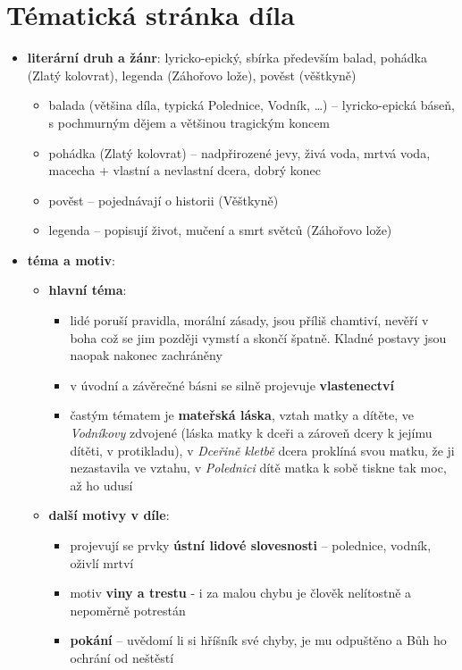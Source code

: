 \documentclass[10pt,a4paper]{article}
\begin{document}
\section*{Tématická stránka díla}
\begin{itemize}
\item \textbf{literární druh a žánr}: lyricko-epický, sbírka především balad, pohádka (Zlatý kolovrat), legenda (Záhořovo lože), pověst (věštkyně)
	\begin{itemize}
	\item balada (většina díla, typická Polednice, Vodník, \ldots) -- lyricko-epická báseň, s pochmurným dějem a většinou tragickým koncem
	\item pohádka (Zlatý kolovrat) -- nadpřirozené jevy, živá voda, mrtvá voda, macecha + vlastní a nevlastní dcera, dobrý konec
	\item pověst -- pojednávají o historii (Věštkyně)
	\item legenda -- popisují život, mučení a smrt světců (Záhořovo lože)
	\end{itemize}
\item \textbf{téma a motiv}: 
	\begin{itemize}
	\item \textbf{hlavní téma}:
		\begin{itemize}
		\item lidé poruší pravidla, morální zásady, jsou příliš chamtiví, nevěří v boha což se jim později vymstí a skončí špatně. Kladné postavy jsou naopak nakonec zachráněny
		\item v úvodní a závěrečné básni se silně projevuje \textbf{vlastenectví}
		\item častým tématem je \textbf{mateřská láska}, vztah matky a dítěte, ve \textit{Vodníkovy} zdvojené (láska matky k dceři a zároveň dcery k jejímu dítěti, v protikladu), v \textit{Dceřině kletbě} dcera proklíná svou matku, že ji nezastavila ve vztahu, v \textit{Polednici} dítě matka k sobě tiskne tak moc, až ho udusí
		\end{itemize}		 
	\item \textbf{další motivy v díle}:
		\begin{itemize}
		\item projevují se prvky \textbf{ústní lidové slovesnosti} -- polednice, vodník, oživlí mrtví
		\item motiv \textbf{viny a trestu} - i za malou chybu je člověk nelítostně a nepoměrně potrestán
		\item \textbf{pokání} -- uvědomí li si hříšník své chyby, je mu odpuštěno a Bůh ho ochrání od neštěstí

\end{itemize}
\end{itemize}
\end{itemize}
\end{document}
